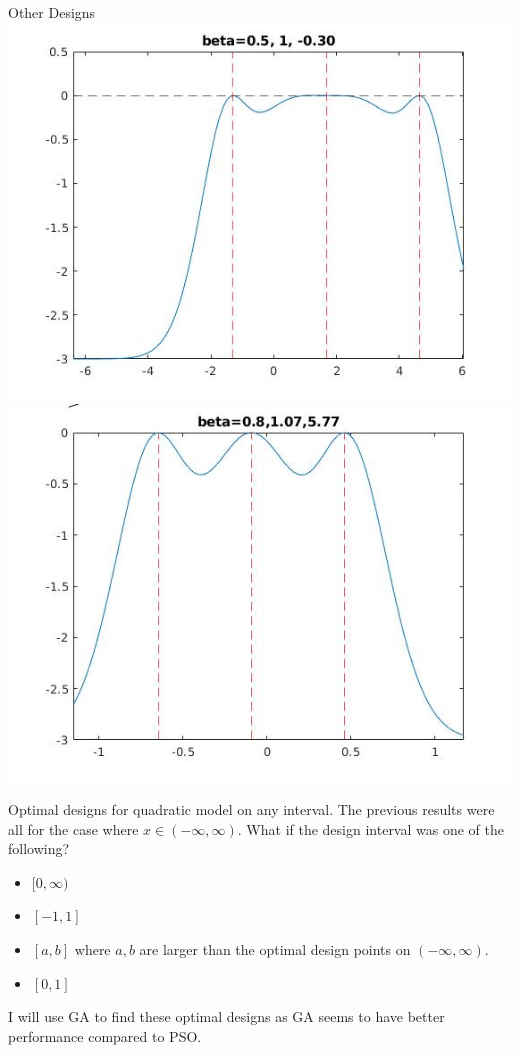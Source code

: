 \documentclass[11pt]{beamer}
\begin{document}
\begin{frame}{Other Designs}
\includegraphics[scale=0.28]{quadplots/example_1.jpg}
\includegraphics[scale=0.28]{quadplots/stackex.jpg}
\end{frame}

\begin{frame}{Optimal designs for quadratic model on any interval.}
The previous results were all for the case where $x \in (-\infty, \infty)$. What if the design interval was one of the following?
\begin{itemize}
\item $[0, \infty)$
\item $[-1, 1]$
\item $[a,b]$ where $a,b$ are larger than the optimal design points on $(-\infty, \infty)$.
\item $[0,1]$
\end{itemize}
I will use GA to find these optimal designs as GA seems to have better performance compared to PSO.
\end{frame}
\end{document}
